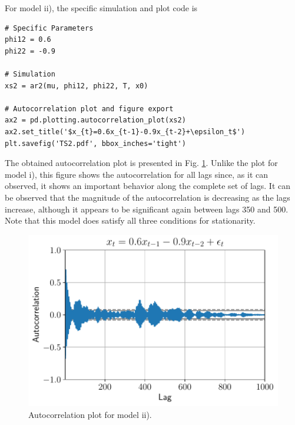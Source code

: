 \documentclass[fleqn]{article}
\begin{document}
\begin{enumerate}
For model ii), the specific simulation and plot code is
\begin{verbatim}
# Specific Parameters
phi12 = 0.6
phi22 = -0.9

# Simulation
xs2 = ar2(mu, phi12, phi22, T, x0)

# Autocorrelation plot and figure export
ax2 = pd.plotting.autocorrelation_plot(xs2)
ax2.set_title('$x_{t}=0.6x_{t-1}-0.9x_{t-2}+\epsilon_t$')
plt.savefig('TS2.pdf', bbox_inches='tight')
\end{verbatim}

The obtained autocorrelation plot is presented in Fig. \ref{fig:ts2}. Unlike the plot for model i), this figure shows the autocorrelation for all lags since, as it can observed, it shows an important behavior along the complete set of lags. It can be observed that the magnitude of the autocorrelation is decreasing as the lags increase, although it appears to be significant again between lags 350 and 500. Note that this model does satisfy all three conditions for stationarity.

\begin{figure}[H]
    \centering
    \includegraphics[scale=.6]{figs/TS2.pdf}
    \caption{Autocorrelation plot for model ii).}
    \label{fig:ts2}
\end{figure}

\end{enumerate}
\end{document}
